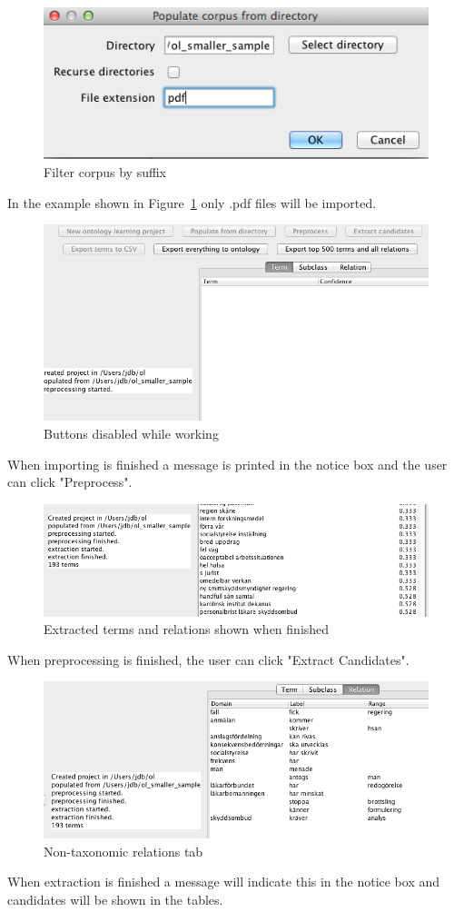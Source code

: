 \documentclass[a4paper]{report}
\begin{document}
\begin{figure}[H]
  \centering
  \includegraphics[width=.5\textwidth]{graphics/6._Filter_corpus_by_suffix.png}
  \caption{Filter corpus by suffix}
  \label{fig:walkthrough6}
\end{figure}
In the example shown in Figure~\ref{fig:walkthrough6} only .pdf files will be imported. 

\begin{figure}[H]
  \centering
  \includegraphics[width=.8\textwidth]{graphics/7._Buttons_disabled_while_working.png}
  \caption{Buttons disabled while working}
  \label{fig:walkthrough7}
\end{figure}
When importing is finished a message is printed in the notice box and the user can click "Preprocess". 

\begin{figure}[H]
  \centering
  \includegraphics[width=.8\textwidth]{graphics/8._Extracted_terms_and_relations_shown_when_finished.png}
  \caption{Extracted terms and relations shown when finished}
  \label{fig:walkthrough8}
\end{figure}
When preprocessing is finished, the user can click "Extract Candidates". 

\begin{figure}[H]
  \centering
  \includegraphics[width=.8\textwidth]{graphics/9._Non-taxonomic_relations_tab.png}
  \caption{Non-taxonomic relations tab}
  \label{fig:walkthrough9}
\end{figure}
When extraction is finished a message will indicate this in the notice box and candidates will be shown in the tables. 
\end{document}
